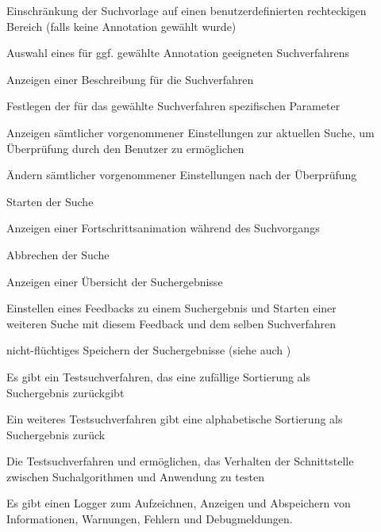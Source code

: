 \begin{description}
	\item[] Einschränkung der Suchvorlage auf einen benutzerdefinierten rechteckigen Bereich (falls keine Annotation gewählt wurde)
	\item[] Auswahl eines für ggf. gewählte Annotation geeigneten Suchverfahrens
	\item[] Anzeigen einer Beschreibung für die Suchverfahren
	\item[] Festlegen der für das gewählte Suchverfahren spezifischen Parameter
	\item[] Anzeigen sämtlicher vorgenommener Einstellungen zur aktuellen Suche, um Überprüfung durch den Benutzer zu ermöglichen
	\item[] Ändern sämtlicher vorgenommener Einstellungen nach der Überprüfung
	\newline
	\item[] Starten der Suche
	\item[] Anzeigen einer Fortschrittsanimation während des Suchvorgangs
	\item[] Abbrechen der Suche
	\newline
	\item[] Anzeigen einer \"Ubersicht der Suchergebnisse  
	\item[] Einstellen eines Feedbacks zu einem Suchergebnis und Starten einer weiteren Suche mit diesem Feedback und dem selben Suchverfahren
	\item[]
	\item[] nicht-flüchtiges Speichern der Suchergebnisse (siehe auch )
	\newline
	\item[] Es gibt ein Testsuchverfahren, das eine zufällige Sortierung als Suchergebnis zurückgibt
	\item[] Ein weiteres Testsuchverfahren gibt eine alphabetische Sortierung als Suchergebnis zurück
	\item[] Die Testsuchverfahren  und  ermöglichen, das Verhalten der Schnittstelle zwischen Suchalgorithmen und Anwendung zu testen
	\item[] Es gibt einen Logger zum Aufzeichnen, Anzeigen und Abspeichern von Informationen, Warnungen, Fehlern und Debugmeldungen.
	 
\end{description}

